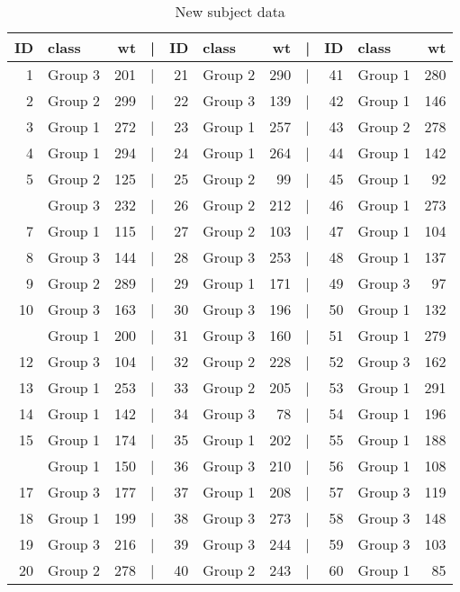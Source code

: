 \documentclass[smallextended]{svjour3}       %
\begin{document}
\begin{table}

\caption{\label{tab:new-data}New subject data}
\centering
\begin{tabular}[t]{rlrlrlrlrlr}
\toprule
ID & class & wt & | & ID & class & wt & | & ID & class & wt\\
\midrule
1 & Group 3 & 201 & | & 21 & Group 2 & 290 & | & 41 & Group 1 & 280\\
2 & Group 2 & 299 & | & 22 & Group 3 & 139 & | & 42 & Group 1 & 146\\
3 & Group 1 & 272 & | & 23 & Group 1 & 257 & | & 43 & Group 2 & 278\\
4 & Group 1 & 294 & | & 24 & Group 1 & 264 & | & 44 & Group 1 & 142\\
5 & Group 2 & 125 & | & 25 & Group 2 & 99 & | & 45 & Group 1 & 92\\
\addlinespace
6 & Group 3 & 232 & | & 26 & Group 2 & 212 & | & 46 & Group 1 & 273\\
7 & Group 1 & 115 & | & 27 & Group 2 & 103 & | & 47 & Group 1 & 104\\
8 & Group 3 & 144 & | & 28 & Group 3 & 253 & | & 48 & Group 1 & 137\\
9 & Group 2 & 289 & | & 29 & Group 1 & 171 & | & 49 & Group 3 & 97\\
10 & Group 3 & 163 & | & 30 & Group 3 & 196 & | & 50 & Group 1 & 132\\
\addlinespace
11 & Group 1 & 200 & | & 31 & Group 3 & 160 & | & 51 & Group 1 & 279\\
12 & Group 3 & 104 & | & 32 & Group 2 & 228 & | & 52 & Group 3 & 162\\
13 & Group 1 & 253 & | & 33 & Group 2 & 205 & | & 53 & Group 1 & 291\\
14 & Group 1 & 142 & | & 34 & Group 3 & 78 & | & 54 & Group 1 & 196\\
15 & Group 1 & 174 & | & 35 & Group 1 & 202 & | & 55 & Group 1 & 188\\
\addlinespace
16 & Group 1 & 150 & | & 36 & Group 3 & 210 & | & 56 & Group 1 & 108\\
17 & Group 3 & 177 & | & 37 & Group 1 & 208 & | & 57 & Group 3 & 119\\
18 & Group 1 & 199 & | & 38 & Group 3 & 273 & | & 58 & Group 3 & 148\\
19 & Group 3 & 216 & | & 39 & Group 3 & 244 & | & 59 & Group 3 & 103\\
20 & Group 2 & 278 & | & 40 & Group 2 & 243 & | & 60 & Group 1 & 85\\
\bottomrule
\end{tabular}
\end{table}
\end{document}
